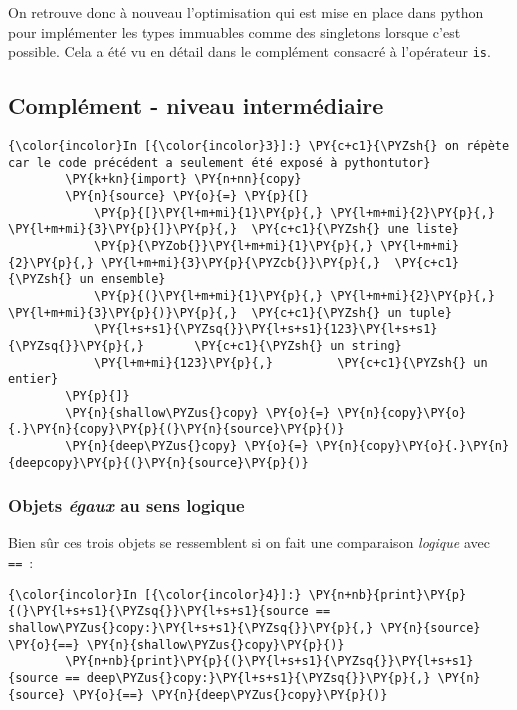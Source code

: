 On retrouve donc à nouveau l'optimisation qui est mise en place dans
python pour implémenter les types immuables comme des singletons lorsque
c'est possible. Cela a été vu en détail dans le complément consacré à
l'opérateur \texttt{is}.

    \hypertarget{compluxe9ment---niveau-intermuxe9diaire}{%
\subsection{Complément - niveau
intermédiaire}\label{compluxe9ment---niveau-intermuxe9diaire}}

    \begin{Verbatim}[commandchars=\\\{\}]
{\color{incolor}In [{\color{incolor}3}]:} \PY{c+c1}{\PYZsh{} on répète car le code précédent a seulement été exposé à pythontutor}
        \PY{k+kn}{import} \PY{n+nn}{copy}
        \PY{n}{source} \PY{o}{=} \PY{p}{[}
            \PY{p}{[}\PY{l+m+mi}{1}\PY{p}{,} \PY{l+m+mi}{2}\PY{p}{,} \PY{l+m+mi}{3}\PY{p}{]}\PY{p}{,}  \PY{c+c1}{\PYZsh{} une liste}
            \PY{p}{\PYZob{}}\PY{l+m+mi}{1}\PY{p}{,} \PY{l+m+mi}{2}\PY{p}{,} \PY{l+m+mi}{3}\PY{p}{\PYZcb{}}\PY{p}{,}  \PY{c+c1}{\PYZsh{} un ensemble}
            \PY{p}{(}\PY{l+m+mi}{1}\PY{p}{,} \PY{l+m+mi}{2}\PY{p}{,} \PY{l+m+mi}{3}\PY{p}{)}\PY{p}{,}  \PY{c+c1}{\PYZsh{} un tuple}
            \PY{l+s+s1}{\PYZsq{}}\PY{l+s+s1}{123}\PY{l+s+s1}{\PYZsq{}}\PY{p}{,}       \PY{c+c1}{\PYZsh{} un string}
            \PY{l+m+mi}{123}\PY{p}{,}         \PY{c+c1}{\PYZsh{} un entier}
        \PY{p}{]}
        \PY{n}{shallow\PYZus{}copy} \PY{o}{=} \PY{n}{copy}\PY{o}{.}\PY{n}{copy}\PY{p}{(}\PY{n}{source}\PY{p}{)}
        \PY{n}{deep\PYZus{}copy} \PY{o}{=} \PY{n}{copy}\PY{o}{.}\PY{n}{deepcopy}\PY{p}{(}\PY{n}{source}\PY{p}{)}
\end{Verbatim}


    \hypertarget{objets-uxe9gaux-au-sens-logique}{%
\subsubsection{\texorpdfstring{Objets \emph{égaux} au sens
logique}{Objets égaux au sens logique}}\label{objets-uxe9gaux-au-sens-logique}}

    Bien sûr ces trois objets se ressemblent si on fait une comparaison
\emph{logique} avec \texttt{==}~:

    \begin{Verbatim}[commandchars=\\\{\}]
{\color{incolor}In [{\color{incolor}4}]:} \PY{n+nb}{print}\PY{p}{(}\PY{l+s+s1}{\PYZsq{}}\PY{l+s+s1}{source == shallow\PYZus{}copy:}\PY{l+s+s1}{\PYZsq{}}\PY{p}{,} \PY{n}{source} \PY{o}{==} \PY{n}{shallow\PYZus{}copy}\PY{p}{)}
        \PY{n+nb}{print}\PY{p}{(}\PY{l+s+s1}{\PYZsq{}}\PY{l+s+s1}{source == deep\PYZus{}copy:}\PY{l+s+s1}{\PYZsq{}}\PY{p}{,} \PY{n}{source} \PY{o}{==} \PY{n}{deep\PYZus{}copy}\PY{p}{)}
\end{Verbatim}


